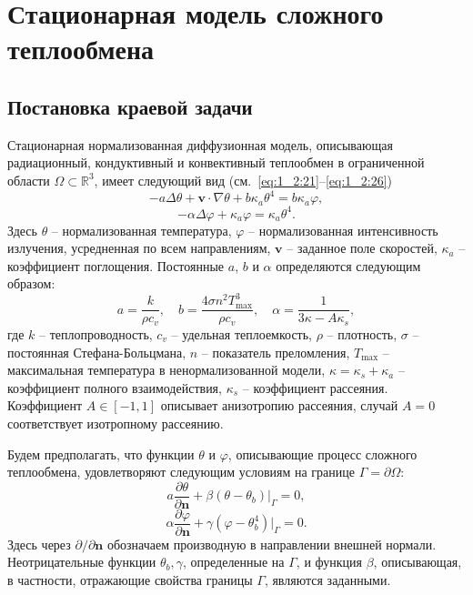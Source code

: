\section{Стационарная модель сложного теплообмена}\label{sec:ch1/sec3}

\subsection{Постановка краевой задачи}
\label{subsec:ch1/sec3/state}

Стационарная нормализованная диффузионная модель, описывающая
радиационный, кондуктивный и конвективный теплообмен в
ограниченной области $\Omega \subset \mathbb{R}^3$,
имеет следующий вид (см.~\eqref{eq:1_2:21}--\eqref{eq:1_2:26})
\begin{equation}
    \label{eq:1_4:4-1}
    -a \Delta \theta + \textbf{v} \cdot \nabla \theta
    + b \kappa_a \theta^4 =  b \kappa_a \varphi,
\end{equation}
\begin{equation}
    \label{eq:1_4:4-2}
    - \alpha \Delta \varphi + \kappa_a \varphi = \kappa_a \theta^4.
\end{equation}
Здесь $\theta$ -- нормализованная температура, $\varphi$ --
нормализованная интенсивность излучения, усредненная по всем
направлениям, $\textbf{v}$ -- заданное поле скоростей, $\kappa_a$ --
коэффициент поглощения.
Постоянные $a$, $b$ и $\alpha$
определяются следующим образом:
\[
    a = \frac{k}{\rho c_v},\quad b = \frac{4\sigma n^2 T_{\max}^3}{\rho c_v},
    \quad \alpha=\frac{1}{3\kappa - A \kappa_s},
\]
где $k$ -- теплопроводность, $c_v$ -- удельная теплоемкость, $\rho$ --
плотность, $\sigma$ -- постоянная Стефана-Больцмана, $n$ --
показатель преломления, $T_{\max}$ -- максимальная температура в
ненормализованной модели, $\kappa = \kappa_s + \kappa_a$ -- коэффициент
полного взаимодействия, $\kappa_s$ -- коэффициент рассеяния.
Коэффициент $A \in [-1, 1]$ описывает анизотропию рассеяния, случай
$A=0$ соответствует изотропному рассеянию.

Будем предполагать, что функции $\theta$ и $\varphi$, описывающие
процесс сложного теплообмена, удовлетворяют следующим условиям на
границе $\Gamma = \partial \Omega$:
\begin{equation}
    \label{eq:1_4:4-3}
    a \frac{\partial \theta}{\partial \mathbf{n}}
    +\left.\beta\left(\theta-\theta_{b}\right)\right|_{\Gamma}=0,
\end{equation}
\begin{equation}
    \label{eq:1_4:4-4}
    \alpha \frac{\partial \varphi}{\partial \mathbf{n}} + \gamma
    (\varphi-\theta_b^4)|_{\Gamma} = 0.
\end{equation}
Здесь через $\partial/\partial \mathbf{n}$ обозначаем производную
в направлении внешней нормали.
Неотрицательные функции $\theta_{b}, \gamma$, определенные на $\Gamma$, и функция $\beta$,
описывающая, в частности, отражающие свойства границы $\Gamma$, являются заданными.

